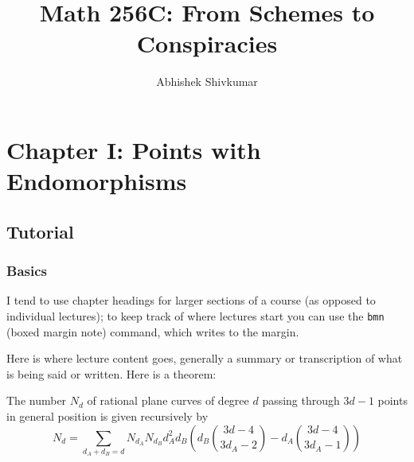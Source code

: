 \documentclass[justified, nofonts, notitlepage, openany, debug, nobib]{tufte-book}
\begin{document}
\title{Math 256C: From Schemes to Conspiracies}
\author{Abhishek Shivkumar}


\chapter{Chapter I: Points with Endomorphisms}
\section{Tutorial}
\subsection{Basics}

I tend to use chapter headings for larger sections of a course (as opposed to individual lectures); to keep track of where lectures start you can use the \texttt{bmn} (boxed margin note) command, which writes to the margin.

Here is where lecture content goes, generally a summary or transcription of what is being said or written. Here is a theorem:
\begin{theorem}
    The number $N_d$ of rational plane curves of degree $d$ passing through $3d-1$ points in general position is given recursively by $$N_d = \sum_{d_A + d_B = d} N_{d_A} N_{d_B} d_A^2 d_B\left(d_B\binom{3d-4}{3d_A -2} - d_A \binom{3d-4}{3d_A-1}\right)$$
\end{theorem}
\end{document}

